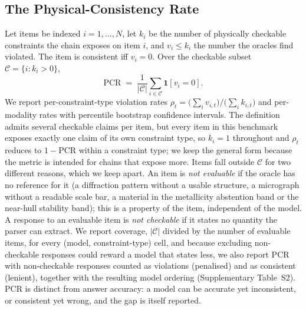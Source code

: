 \documentclass[pdflatex,sn-nature]{sn-jnl}
\newcommand{\rev}[1]{#1} %
\newcommand{\rev}[1]{{\color{blue}#1}} %
\providecommand{\DIFadd}[1]{{\protect\color{blue} \sf #1}} %
\providecommand{\DIFaddbegin}{} %
\providecommand{\DIFaddend}{} %
\providecommand{\DIFaddincludegraphics}[2][]{{\color{blue}\fbox{\DIFOincludegraphics[#1]{#2}}}} %
\DeclareRobustCommand{\DIFaddbegin}{\DIFOaddbegin \let\includegraphics\DIFaddincludegraphics} %
\DeclareRobustCommand{\DIFaddend}{\DIFOaddend \let\includegraphics\DIFOincludegraphics} %
\begin{document}
\subsection*{The Physical-Consistency Rate}
Let items be indexed $i=1,\dots,N$, let $k_i$ be the number of physically checkable
constraints the chain exposes on item $i$, and $v_i \le k_i$ the number the oracles
find violated. The item is consistent iff $v_i=0$. Over the checkable subset
$\mathcal{C}=\{i:k_i>0\}$,
\begin{equation}
\mathrm{PCR} \;=\; \frac{1}{|\mathcal{C}|}\sum_{i\in\mathcal{C}} \mathbf{1}[v_i = 0].
\end{equation}
We report per-constraint-type violation rates
$\rho_t=\big(\sum_i v_{i,t}\big)/\big(\sum_i k_{i,t}\big)$ and per-modality rates with
percentile bootstrap confidence intervals. The definition admits several checkable claims per
item, but every item in this benchmark exposes exactly one claim of its own constraint type,
so $k_i=1$ throughout and $\rho_t$ reduces to $1-\mathrm{PCR}$ within a constraint type; we
keep the general form because the metric is intended for chains that expose more. \DIFaddbegin \DIFadd{\rev{Items fall
outside $\mathcal{C}$ for two different reasons, which we keep apart. An item is \emph{not evaluable} if the
oracle has no reference for it (a diffraction pattern without a usable structure, a micrograph without
a readable scale bar, a material in the metallicity abstention band\rev{ or the near-hull stability band}); this is a property of the item,
independent of the model. A response to an evaluable item is \emph{not checkable} if it states no
quantity the parser can extract. We report coverage, $|\mathcal{C}|$ divided by the number of
evaluable items, for every (model, constraint-type) cell, and because excluding non-checkable responses
could reward a model that states less, we also report PCR with non-checkable responses counted as
violations (penalised) and as consistent (lenient), together with the resulting model ordering
(Supplementary Table~S2).} }\DIFaddend PCR is distinct from answer accuracy: a
model can be accurate yet inconsistent, or consistent yet wrong, and the gap is
itself reported.
\end{document}

